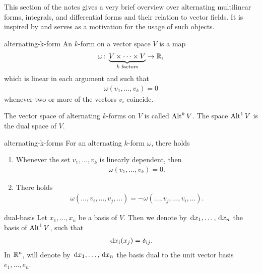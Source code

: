 \begin{intro}
  This section of the notes gives a very brief overview over
  alternating multilinear forms, integrals, and differential forms and
  their relation to vector fields. It is inspired by \cite{Hiptmair02}
  and serves as a motivation for the usage of such objects.
\end{intro}

\begin{Definition}{alternating-k-form}
  An  $k$-form on a vector space $V$ is a map
  \begin{gather}
    \omega\colon\underbrace{V\times \dots\times V}_{k \text{ factors}} \to \mathbb R,
  \end{gather}
  which is linear in each argument and such that
  \begin{gather}
    \omega(v_1,\dots,v_k) = 0
  \end{gather}
  whenever two or more of the vectors $v_i$ coincide.

  The vector space of alternating $k$-forms on $V$ is called
  $\operatorname{Alt}^k V$. The space $\operatorname{Alt}^1 V$ is the dual space of $V$.
\end{Definition}

\begin{Lemma}{alternating-k-forms}
  For an alternating $k$-form $\omega$, there holds
  \begin{enumerate}
  \item Whenever the set $v_1,\dots,v_k$ is linearly dependent, then
    \begin{gather}
      \omega(v_1,\dots,v_k) = 0.
    \end{gather}
  \item There holds
    \begin{gather}
      \omega(\ldots,v_i,\ldots,v_j,\ldots) = - \omega(\ldots,v_j,\ldots,v_i,\ldots).
    \end{gather}
  \end{enumerate}
\end{Lemma}

\begin{Notation}{dual-basis}
  Let $x_1,\dots,x_n$ be a basis of $V$. Then we denote by $\,\mathrm{d} x_1,\dots,\,\mathrm{d} x_n$ the basis of $\operatorname{Alt}^1V$,
  such that
  \begin{gather}
    \,\mathrm{d} x_i(x_j) = \delta_{ij}.
  \end{gather}
  In $\mathbb R^n$, will denote by $\,\mathrm{d} x_1,\dots,\,\mathrm{d} x_n$ the basis dual to the
  unit vector basis $e_1,\dots,e_n$.
\end{Notation}


